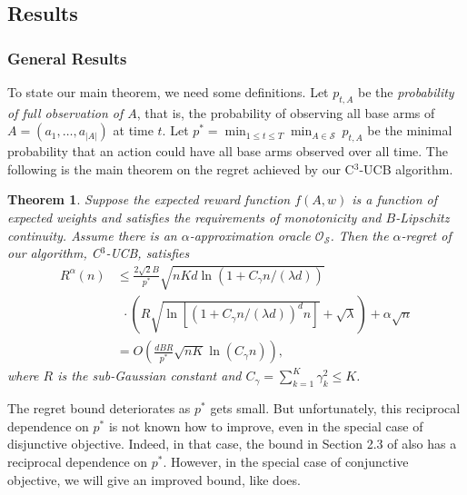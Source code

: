 \documentclass{article}
\newcommand{\cO}{\mathcal{O}}
\newcommand{\cS}{\mathcal{S}}
\newcommand{\abs}[1]{\left| #1 \right|}
\newtheorem{theorem}{Theorem}[section]
\begin{document}
\subsection{Results}

\subsubsection{General Results}

To state our main theorem, we need some definitions. Let $p_{t, A}$ be the {\em probability of full observation of $A$}, that is, the probability of observing all base arms of $A = (a_1, \ldots, a_{\abs{A}})$ at time $t$. Let $p^* = \min_{1 \leq t \leq T} \min_{A \in \cS} ~ p_{t, A}$ be the minimal probability that an action could have all base arms observed over all time. The following is the main theorem on the regret achieved by our C$^3$-UCB algorithm.

\begin{theorem} %
	\label{thm:main}
	Suppose the expected reward function $f(A, w)$ is a function of expected weights and satisfies the requirements of monotonicity and $B$-Lipschitz continuity. Assume there is an $\alpha$-approximation oracle $\cO_{\cS}$. Then the $\alpha$-regret of our algorithm, C$^3$-UCB, satisfies
	\begin{align}
		R^{\alpha}(n) &\le \frac{2\sqrt{2}B}{p^*} \sqrt{nKd\ln(1 + C_\gamma n/(\lambda d))}  \nonumber \\
		&~~ \cdot \left(R\sqrt{\ln \left[(1 + C_\gamma n/(\lambda d))^d n \right] } + \sqrt{\lambda}\right) + \alpha \sqrt{n}\nonumber \\
		&=O\left(\frac{dBR}{p^*} \sqrt{nK} \ln(C_\gamma n) \right),
	\end{align}
	where $R$ is the sub-Gaussian constant and $C_{\gamma} = \sum_{k=1}^K \gamma_k^2 \leq K$.
\end{theorem}
The regret bound deteriorates as $p^*$ gets small. But unfortunately, this reciprocal dependence on $p^*$ is not known how to improve, even in the special case of disjunctive objective. Indeed, in that case, the bound in Section 2.3 of \cite{kveton2015combinatorial} also has a reciprocal dependence on $p^*$. However, in the special case of conjunctive objective, we will give an improved bound, like \cite{kveton2015combinatorial} does.
\end{document}
